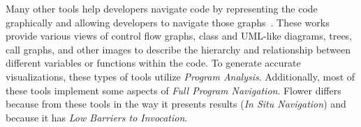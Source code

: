 \documentclass[conference]{IEEEtran}
\begin{document}
Many other tools help developers navigate code by representing the code graphically and allowing developers to navigate those graphs~\cite{CodeBubbles,CodeCanvas,CodeSurfer,Dora,Reacher,Relo,Whyline}. 
These works provide various views of control flow graphs, class and UML-like diagrams, trees, call graphs, and other images to describe the hierarchy and relationship between different variables or functions within the code. 
To generate accurate visualizations, these types of tools utilize \textit{Program Analysis}.
Additionally, most of these tools implement some aspects of \textit{Full Program Navigation}.
Flower differs because from these tools in the way it presents results (\textit{In Situ Navigation}) and because it has \textit{Low Barriers to Invocation}.

%
\end{document}
